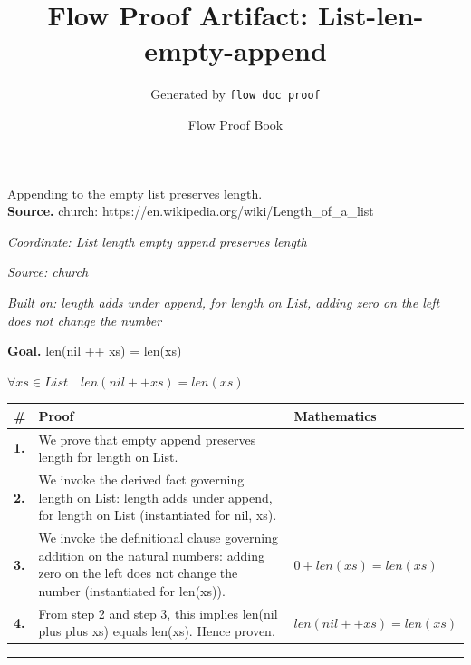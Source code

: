 \documentclass[11pt]{article}
\title{Flow Proof Artifact: List-len-empty-append}
\author{Generated by \texttt{flow doc proof}}
\date{Flow Proof Book}
\theoremstyle{definition}
\begin{document}
\maketitle
Appending to the empty list preserves length.\\[0.5em]
\textbf{Source.} church: https://en.wikipedia.org/wiki/Length\_of\_a\_list\\[0.5em]
\bigskip
{}\par
\smallskip\noindent\textit{Coordinate: List \cdot length \cdot empty append preserves length}\par
\smallskip\noindent\textit{Source: church}\par
\smallskip\noindent\textit{Built on: length adds under append, for length on List, adding zero on the left does not change the number}\par
\medskip
\noindent\textbf{Goal.} len(nil ++ xs) = len(xs)\par
\noindent$\displaystyle \forall xs \in List\quad len(nil ++ xs) = len(xs)$\par
\medskip
\noindent
\begin{tabular}{@{} >{\raggedright\arraybackslash}p{} >{\raggedright\arraybackslash}p{} >{\raggedleft\arraybackslash}p{} @{}}
\textbf{\#} & \textbf{Proof} & \textbf{Mathematics} \\
\midrule
\textbf{1.} & We prove that empty append preserves length for length on List. & \\[0.45em]
\textbf{2.} & We invoke the derived fact governing length on List: length adds under append, for length on List (instantiated for nil, xs). & \\[0.45em]
\textbf{3.} & We invoke the definitional clause governing addition on the natural numbers: adding zero on the left does not change the number (instantiated for len(xs)). & $\displaystyle 0 + len(xs) = len(xs)$ \\[0.45em]
\textbf{4.} & From step 2 and step 3, this implies len(nil plus plus xs) equals len(xs). Hence proven. & $\displaystyle len(nil ++ xs) = len(xs)$ \\[0.45em]
\bottomrule
\end{tabular}
\label{thm:List-length-empty_append_preserves_length}
\par\medskip\hrule
\end{document}

